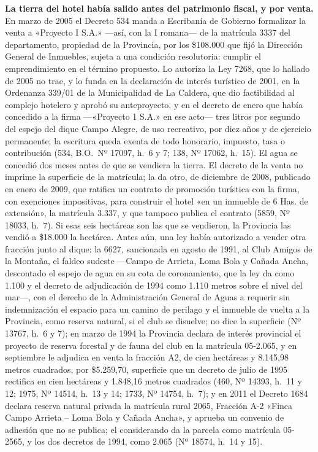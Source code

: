 \textbf{La tierra del hotel había salido antes del patrimonio fiscal, y por venta.} En marzo de 2005 el Decreto 534 manda a Escribanía de Gobierno formalizar la venta a «Proyecto I S.A.» ---así, con la I romana--- de la matrícula 3337 del departamento, propiedad de la Provincia, por los \$108.000 que fijó la Dirección General de Inmuebles, sujeta a una condición resolutoria: cumplir el emprendimiento en el término propuesto. Lo autoriza la Ley 7268, que lo hallado de 2005 no trae, y lo funda en la declaración de interés turístico de 2001, en la Ordenanza 339/01 de la Municipalidad de La Caldera, que dio factibilidad al complejo hotelero y aprobó su anteproyecto, y en el decreto de enero que había concedido a la firma ---«Proyecto 1 S.A.» en ese acto--- tres litros por segundo del espejo del dique Campo Alegre, de uso recreativo, por diez años y de ejercicio permanente; la escritura queda exenta de todo honorario, impuesto, tasa o contribución (534, B.O.\ Nº 17097, h.\ 6 y 7; 138, Nº 17062, h.\ 15). El agua se concedió dos meses antes de que se vendiera la tierra. El decreto de la venta no imprime la superficie de la matrícula; la da otro, de diciembre de 2008, publicado en enero de 2009, que ratifica un contrato de promoción turística con la firma, con exenciones impositivas, para construir el hotel «en un inmueble de 6 Has. de extensión», la matrícula 3.337, y que tampoco publica el contrato (5859, Nº 18033, h.\ 7). Si esas seis hectáreas son las que se vendieron, la Provincia las vendió a \$18.000 la hectárea. Antes aún, una ley había autorizado a vender otra fracción junto al dique: la 6627, sancionada en agosto de 1991, al Club Amigos de la Montaña, el faldeo sudeste ---Campo de Arrieta, Loma Bola y Cañada Ancha, descontado el espejo de agua en su cota de coronamiento, que la ley da como 1.100 y el decreto de adjudicación de 1994 como 1.110 metros sobre el nivel del mar---, con el derecho de la Administración General de Aguas a requerir sin indemnización el espacio para un camino de perilago y el inmueble de vuelta a la Provincia, como reserva natural, si el club se disuelve; no dice la superficie (Nº 13767, h.\ 6 y 7); en marzo de 1994 la Provincia declara de interés provincial el proyecto de reserva forestal y de fauna del club en la matrícula 05-2.065, y en septiembre le adjudica en venta la fracción A2, de cien hectáreas y 8.145,98 metros cuadrados, por \$5.259,70, superficie que un decreto de julio de 1995 rectifica en cien hectáreas y 1.848,16 metros cuadrados (460, Nº 14393, h.\ 11 y 12; 1975, Nº 14514, h.\ 13 y 14; 1733, Nº 14754, h.\ 7); y en 2011 el Decreto 1684 declara reserva natural privada la matrícula rural 2065, Fracción A-2 «Finca Campo Arrieta -- Loma Bola y Cañada Ancha», y aprueba un convenio de adhesión que no se publica; el considerando da la parcela como matrícula 05-2565, y los dos decretos de 1994, como 2.065 (Nº 18574, h.\ 14 y 15).

